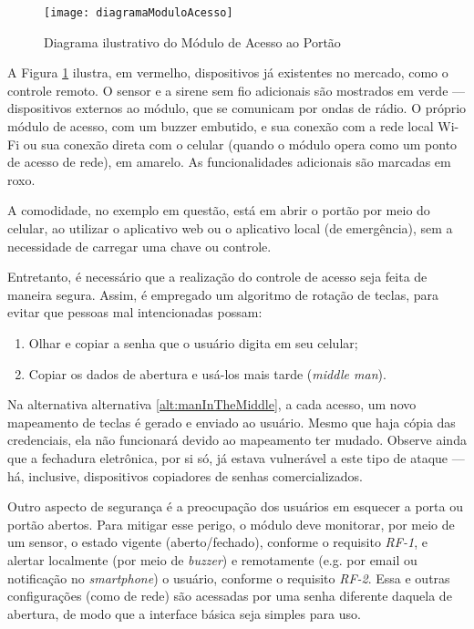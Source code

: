 \begin{figure}[H]
	\centering
	\caption{Diagrama ilustrativo do Módulo de Acesso ao Portão}
  \texttt{[image: diagramaModuloAcesso]}
\label{fig:diagramaModuloAcesso}
\end{figure}

A Figura \ref{fig:diagramaModuloAcesso} ilustra, em vermelho, dispositivos já existentes no mercado, como o controle remoto. O sensor e a sirene sem fio adicionais são mostrados em verde --- dispositivos externos ao módulo, que se comunicam por ondas de rádio. O próprio módulo de acesso, com um buzzer embutido, e sua conexão com a rede local Wi-Fi ou sua conexão direta com o celular (quando o módulo opera como um ponto de acesso de rede), em amarelo. As funcionalidades adicionais são marcadas em roxo.

A comodidade, no exemplo em questão, está em abrir o portão por meio do celular, ao utilizar o aplicativo web ou o aplicativo local (de emergência), sem a necessidade de carregar uma chave ou controle.

Entretanto, é necessário que a realização do controle de acesso seja feita de maneira segura. Assim, é empregado um algoritmo de rotação de teclas, para evitar que pessoas mal intencionadas possam:

\begin{enumerate}
	\item Olhar e copiar a senha que o usuário digita em seu celular;
	\item \label{alt:manInTheMiddle} Copiar os dados de abertura e usá-los mais tarde (\textit{middle man}).
\end{enumerate}

Na alternativa alternativa \ref{alt:manInTheMiddle}, a cada acesso, um novo mapeamento de teclas é gerado e enviado ao usuário. Mesmo que haja cópia das credenciais, ela não funcionará devido ao mapeamento ter mudado. Observe ainda que a fechadura eletrônica, por si só, já estava vulnerável a este tipo de ataque --- há, inclusive, dispositivos copiadores de senhas comercializados.

Outro aspecto de segurança é a preocupação dos usuários em esquecer a porta ou portão abertos. Para mitigar esse perigo, o módulo deve monitorar, por meio de um sensor, o estado vigente (aberto/fechado), conforme o requisito \emph{RF-1}, e alertar localmente (por meio de \textit{buzzer}) e remotamente (e.g. por email ou notificação no \textit{smartphone}) o usuário, conforme o requisito \emph{RF-2}. Essa e outras configurações (como de rede) são acessadas por uma senha diferente daquela de abertura, de modo que a interface básica seja simples para uso.

